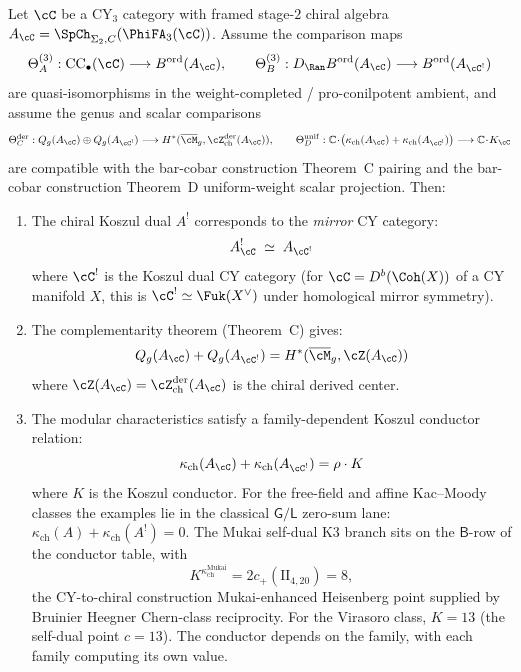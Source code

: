 \begin{theorem}
\label{conj:cy-koszul-dictionary}
Let $\cC$ be a CY$_3$ category with framed stage-$2$ chiral algebra
$A_\cC=\SpCh_{\Sigma_2,C}(\PhiFA_3(\cC))$. Assume the comparison maps
\[
\Theta_A^{(3)}:\mathrm{CC}_\bullet(\cC)\longrightarrow
B^{\mathrm{ord}}(A_\cC),\qquad
\Theta_B^{(3)}:D_{\Ran}B^{\mathrm{ord}}(A_\cC)\longrightarrow
B^{\mathrm{ord}}(A_{\cC^!})
\]
are quasi-isomorphisms in the weight-completed / pro-conilpotent ambient,
and assume the genus and scalar comparisons
\[
\Theta_C^{\mathrm{der}}:
Q_g(A_\cC)\oplus Q_g(A_{\cC^!})\longrightarrow
H^*(\overline{\cM}_g,\cZ_{\mathrm{ch}}^{\mathrm{der}}(A_\cC)),\qquad
\Theta_D^{\mathrm{unif}}:
\mathbb C\!\cdot\!\bigl(\kappa_{\mathrm{ch}}(A_\cC)+
\kappa_{\mathrm{ch}}(A_{\cC^!})\bigr)\longrightarrow
\mathbb C\!\cdot\!K_\cC
\]
are compatible with the bar-cobar construction Theorem~C pairing and the bar-cobar construction Theorem~D
uniform-weight scalar projection. Then:
\begin{enumerate}[label=(\roman*)]
 \item The chiral Koszul dual $A^!$ corresponds to the \emph{mirror} CY category:
 \[
 A_\cC^! \;\simeq\; A_{\cC^!}
 \]
 where $\cC^!$ is the Koszul dual CY category (for $\cC = D^b(\Coh(X))$ of a CY manifold $X$, this is $\cC^! \simeq \Fuk(X^\vee)$ under homological mirror symmetry).
 \item The complementarity theorem (Theorem~C) gives:
 \[
 Q_g(A_\cC) + Q_g(A_{\cC^!}) = H^*(\overline{\cM}_g, \cZ(A_\cC))
 \]
 where $\cZ(A_\cC) = \cZ^{\mathrm{der}}_{\mathrm{ch}}(A_\cC)$ is the chiral derived center.
 \item The modular characteristics satisfy a family-dependent Koszul conductor relation:
 \[
 \kappa_{\mathrm{ch}}(A_\cC) + \kappa_{\mathrm{ch}}(A_{\cC^!}) = \rho \cdot K
 \]
 where $K$ is the Koszul conductor. For the free-field and affine
 Kac--Moody classes the examples lie in the classical
 $\mathsf{G} / \mathsf{L}$ zero-sum lane:
 $\kappa_{\mathrm{ch}}(A) + \kappa_{\mathrm{ch}}(A^!) = 0$. The
 Mukai self-dual K3 branch sits on the $\mathsf{B}$-row of the
 conductor table, with
 \[
 K^{\kappa_{\mathrm{ch}}^{\mathrm{Mukai}}} = 2 c_+(\mathrm{II}_{4, 20}) = 8,
 \]
 the CY-to-chiral construction Mukai-enhanced Heisenberg point supplied by Bruinier
 Heegner Chern-class reciprocity. For the Virasoro class,
 $K = 13$ (the self-dual point $c = 13$). The conductor depends on
 the family, with each family computing its own value.
\end{enumerate}
\end{theorem}

